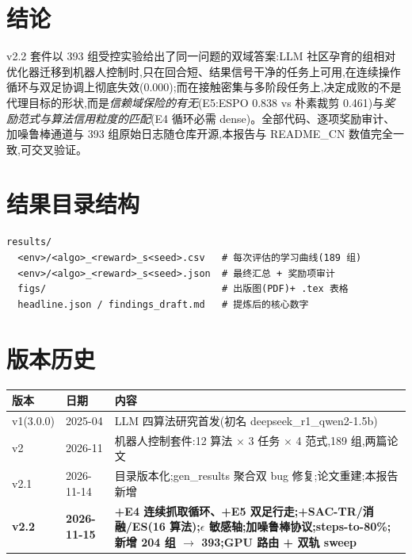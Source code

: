 \documentclass[11pt,a4paper]{ctexart}
\begin{document}
\section{结论}

v2.2 套件以 393 组受控实验给出了同一问题的双域答案:LLM 社区孕育的组相对优化器迁移到机器人控制时,只在回合短、结果信号干净的任务上可用,在连续操作循环与双足协调上彻底失效(0.000);而在接触密集与多阶段任务上,决定成败的不是代理目标的形状,而是\emph{信赖域保险的有无}(E5:ESPO 0.838 vs 朴素裁剪 0.461)与\emph{奖励范式与算法信用粒度的匹配}(E4 循环必需 dense)。全部代码、逐项奖励审计、加噪鲁棒通道与 393 组原始日志随仓库开源,本报告与 README\_CN 数值完全一致,可交叉验证。

\appendix
\section{结果目录结构}
\begin{verbatim}
results/
  <env>/<algo>_<reward>_s<seed>.csv   # 每次评估的学习曲线(189 组)
  <env>/<algo>_<reward>_s<seed>.json  # 最终汇总 + 奖励项审计
  figs/                               # 出版图(PDF)+ .tex 表格
  headline.json / findings_draft.md   # 提炼后的核心数字
\end{verbatim}

\section{版本历史}
\begin{table}[H]
\centering\small
\begin{tabular}{l l p{9.6cm}}
\toprule
版本 & 日期 & 内容 \\
\midrule
v1(3.0.0) & 2025-04 & LLM 四算法研究首发(初名 deepseek\_r1\_qwen2-1.5b) \\
v2 & 2026-11 & 机器人控制套件:12 算法 $\times$ 3 任务 $\times$ 4 范式,189 组,两篇论文 \\
v2.1 & 2026-11-14 & 目录版本化;gen\_results 聚合双 bug 修复;论文重建;本报告新增 \\
\textbf{v2.2} & \textbf{2026-11-15} & \textbf{+E4 连续抓取循环、+E5 双足行走;+SAC-TR/消融/ES(16 算法);$\epsilon$ 敏感轴;加噪鲁棒协议;steps-to-80\%;新增 204 组 $\to$ 393;GPU 路由 + 双轨 sweep} \\
\bottomrule
\end{tabular}
\end{table}
\end{document}
